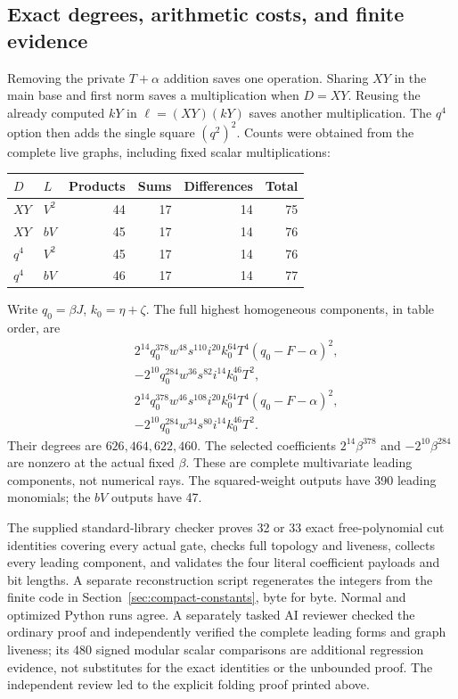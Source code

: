 \subsection{Exact degrees, arithmetic costs, and finite evidence}
\label{subsec:compact-metrics}

Removing the private \(T+\alpha\) addition saves one operation.
Sharing \(XY\) in the main base and first norm saves a multiplication
when \(D=XY\).  Reusing the already computed \(kY\) in
\(\ell=(XY)(kY)\) saves another multiplication.  The \(q^4\) option
then adds the single square \((q^2)^2\).  Counts were obtained from
the complete live graphs, including fixed scalar multiplications:
\begin{center}
\begin{tabular}{@{}llrrrr@{}}
\toprule
\(D\)&\(L\)&Products&Sums&Differences&Total\\
\midrule
\(XY\)&\(V^2\)&44&17&14&75\\
\(XY\)&\(bV\)&45&17&14&76\\
\(q^4\)&\(V^2\)&45&17&14&76\\
\(q^4\)&\(bV\)&46&17&14&77\\
\bottomrule
\end{tabular}
\end{center}

Write \(q_0=\beta J\), \(k_0=\eta+\zeta\).
The full highest homogeneous components, in table order, are
\begin{align}
 &2^{14}q_0^{378}w^{48}s^{110}i^{20}k_0^{64}T^4
       (q_0-F-\alpha)^2,\nonumber\\
 &-2^{10}q_0^{284}w^{36}s^{82}i^{14}k_0^{46}T^2,\nonumber\\
 &2^{14}q_0^{378}w^{46}s^{108}i^{20}k_0^{64}T^4
       (q_0-F-\alpha)^2,\nonumber\\
 &-2^{10}q_0^{284}w^{34}s^{80}i^{14}k_0^{46}T^2.
 \label{eq:compact-leading}
\end{align}
Their degrees are \(626,464,622,460\).  The selected coefficients
\(2^{14}\beta^{378}\) and \(-2^{10}\beta^{284}\) are nonzero at the
actual fixed \(\beta\).  These are complete multivariate leading
components, not numerical rays.  The squared-weight outputs have 390
leading monomials; the \(bV\) outputs have 47.

The supplied standard-library checker proves 32 or 33 exact
free-polynomial cut identities covering every actual gate, checks full
topology and liveness, collects every leading component, and validates
the four literal coefficient payloads and bit lengths.  A separate
reconstruction script regenerates the integers from the finite code in
Section~\ref{sec:compact-constants}, byte for byte.  Normal and optimized
Python runs agree.  A separately tasked AI reviewer checked the ordinary
proof and independently verified the complete leading forms and graph
liveness; its 480 signed modular scalar comparisons are additional
regression evidence, not substitutes for the exact identities or the
unbounded proof.  The independent review led to the explicit folding
proof printed above.

